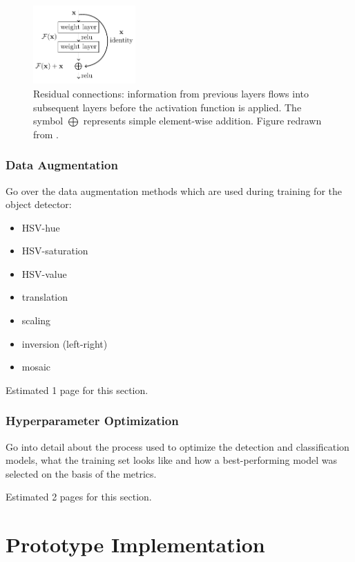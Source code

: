 \documentclass[draft,final]{vutinfth} %
\begin{document}
\begin{figure}
  \centering
  \includegraphics[width=0.35\textwidth]{graphics/residual-connection/res.pdf}
  \caption[Residual connection]{Residual connections: information from
    previous layers flows into subsequent layers before the activation
    function is applied. The symbol $\bigoplus$ represents simple
    element-wise addition. Figure redrawn from \textcite{he2016}.}
  \label{fig:residual-connection}
\end{figure}


\subsection{Data Augmentation}
\label{sec:methods-augmentation}

Go over the data augmentation methods which are used during training
for the object detector:
\begin{itemize}
\item HSV-hue
\item HSV-saturation
\item HSV-value
\item translation
\item scaling
\item inversion (left-right)
\item mosaic
\end{itemize}

Estimated 1 page for this section.

\subsection{Hyperparameter Optimization}
\label{sec:methods-hypopt}

Go into detail about the process used to optimize the detection and
classification models, what the training set looks like and how a
best-performing model was selected on the basis of the metrics.

Estimated 2 pages for this section.

\chapter{Prototype Implementation}
\label{chap:implementation}
\end{document}

